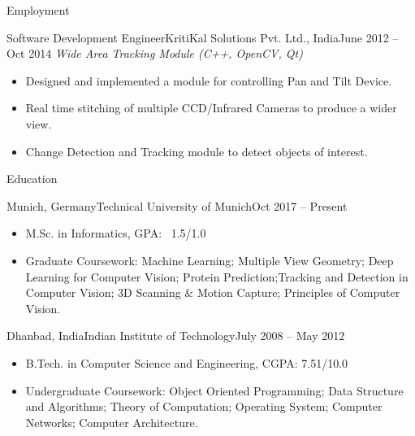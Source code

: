 \documentclass[]{mcdowellcv}
\begin{document}
\begin{cvsection}{Employment}
\begin{cvsubsection}{Software Development Engineer}{KritiKal Solutions Pvt. Ltd., India}{June 2012 -- Oct 2014}
            \textit{Wide Area Tracking Module (C++, OpenCV, Qt)}
            \begin{itemize}
                \item Designed and implemented a module for controlling Pan and Tilt Device.
                \item Real time stitching of multiple CCD/Infrared Cameras to produce a wider view.
                \item Change Detection and Tracking module to detect objects of interest.
            \end{itemize}
        \end{cvsubsection}
    \end{cvsection}
    

    \begin{cvsection}{Education}
        \begin{cvsubsection}{Munich, Germany}{Technical University of Munich}{Oct 2017 -- Present}
            \begin{itemize}
                \item M.Sc. in Informatics, GPA: ~1.5/1.0
                \item Graduate Coursework: Machine Learning; Multiple View Geometry; Deep Learning for Computer Vision; Protein Prediction;Tracking and Detection in Computer Vision; 3D Scanning & Motion Capture; Principles of Computer Vision.
            \end{itemize}
        \end{cvsubsection}
        \begin{cvsubsection}{Dhanbad, India}{Indian Institute of Technology}{July 2008 -- May 2012}
            \begin{itemize}
                \item B.Tech. in Computer Science and Engineering,  CGPA: 7.51/10.0
                \item Undergraduate Coursework: Object Oriented Programming; Data Structure and Algorithms; Theory of Computation; Operating System; Computer Networks; Computer Architecture.
            \end{itemize}
        \end{cvsubsection}
    \end{cvsection}
    
\end{document}
